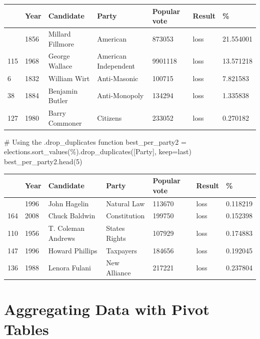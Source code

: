 \documentclass[
  letterpaper,
  DIV=11,
  numbers=noendperiod]{scrreprt}
\newenvironment{Shaded}{\begin{snugshade}}{\end{snugshade}}
\newcommand{\CommentTok}[1]{\textcolor[rgb]{0.37,0.37,0.37}{#1}}
\newcommand{\DecValTok}[1]{\textcolor[rgb]{0.68,0.00,0.00}{#1}}
\newcommand{\NormalTok}[1]{\textcolor[rgb]{0.00,0.23,0.31}{#1}}
\newcommand{\OperatorTok}[1]{\textcolor[rgb]{0.37,0.37,0.37}{#1}}
\newcommand{\StringTok}[1]{\textcolor[rgb]{0.13,0.47,0.30}{#1}}
\begin{document}
\begin{longtable}[]{@{}lllllll@{}}
\toprule\noalign{}
& Year & Candidate & Party & Popular vote & Result & \% \\
\midrule\noalign{}
\endhead
\bottomrule\noalign{}
\endlastfoot
22 & 1856 & Millard Fillmore & American & 873053 & loss & 21.554001 \\
115 & 1968 & George Wallace & American Independent & 9901118 & loss &
13.571218 \\
6 & 1832 & William Wirt & Anti-Masonic & 100715 & loss & 7.821583 \\
38 & 1884 & Benjamin Butler & Anti-Monopoly & 134294 & loss &
1.335838 \\
127 & 1980 & Barry Commoner & Citizens & 233052 & loss & 0.270182 \\
\end{longtable}

\begin{Shaded}
\begin{Highlighting}[]
\CommentTok{\# Using the .drop\_duplicates function}
\NormalTok{best\_per\_party2 }\OperatorTok{=}\NormalTok{ elections.sort\_values(}\StringTok{\textquotesingle{}\%\textquotesingle{}}\NormalTok{).drop\_duplicates([}\StringTok{\textquotesingle{}Party\textquotesingle{}}\NormalTok{], keep}\OperatorTok{=}\StringTok{\textquotesingle{}last\textquotesingle{}}\NormalTok{)}
\NormalTok{best\_per\_party2.head(}\DecValTok{5}\NormalTok{)}
\end{Highlighting}
\end{Shaded}

\begin{longtable}[]{@{}lllllll@{}}
\toprule\noalign{}
& Year & Candidate & Party & Popular vote & Result & \% \\
\midrule\noalign{}
\endhead
\bottomrule\noalign{}
\endlastfoot
148 & 1996 & John Hagelin & Natural Law & 113670 & loss & 0.118219 \\
164 & 2008 & Chuck Baldwin & Constitution & 199750 & loss & 0.152398 \\
110 & 1956 & T. Coleman Andrews & States\textquotesingle{} Rights &
107929 & loss & 0.174883 \\
147 & 1996 & Howard Phillips & Taxpayers & 184656 & loss & 0.192045 \\
136 & 1988 & Lenora Fulani & New Alliance & 217221 & loss & 0.237804 \\
\end{longtable}

\section{Aggregating Data with Pivot
Tables}\label{aggregating-data-with-pivot-tables}
\end{document}

